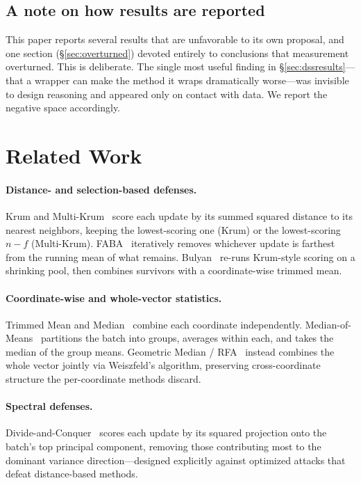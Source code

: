 \documentclass[11pt,a4paper]{article}
\begin{document}
\subsection{A note on how results are reported}

This paper reports several results that are unfavorable to its own
proposal, and one section (\S\ref{sec:overturned}) devoted entirely to
conclusions that measurement overturned. This is deliberate. The single
most useful finding in \S\ref{sec:dssresults}---that a wrapper can make
the method it wraps dramatically worse---was invisible to design
reasoning and appeared only on contact with data. We report the negative
space accordingly.

\section{Related Work}
\label{sec:related}

\paragraph{Distance- and selection-based defenses.}
Krum and Multi-Krum~\cite{blanchard2017} score each update by its summed
squared distance to its nearest neighbors, keeping the lowest-scoring one
(Krum) or the lowest-scoring $n-f$ (Multi-Krum). FABA~\cite{xia2019}
iteratively removes whichever update is farthest from the running mean of
what remains. Bulyan~\cite{elmhamdi2018} re-runs Krum-style scoring on a
shrinking pool, then combines survivors with a coordinate-wise trimmed
mean.

\paragraph{Coordinate-wise and whole-vector statistics.}
Trimmed Mean and Median~\cite{yin2018} combine each coordinate
independently. Median-of-Means~\cite{chen2017} partitions the batch into
groups, averages within each, and takes the median of the group means.
Geometric Median / RFA~\cite{pillutla2019} instead combines the whole
vector jointly via Weiszfeld's algorithm, preserving cross-coordinate
structure the per-coordinate methods discard.

\paragraph{Spectral defenses.}
Divide-and-Conquer~\cite{shejwalkar2021} scores each update by its
squared projection onto the batch's top principal component, removing
those contributing most to the dominant variance direction---designed
explicitly against optimized attacks that defeat distance-based methods.
\end{document}
